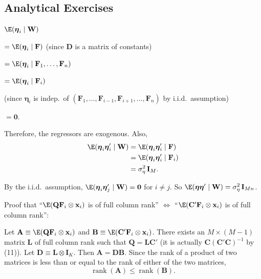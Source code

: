 \begin{answers}

\subsection*{Analytical Exercises}

$\E(\boldsymbol{\eta}_i \mid \mathbf{W})$

$= \E(\boldsymbol{\eta}_i \mid \mathbf{F})$ \quad (since $\mathbf{D}$ is a matrix of constants)

$= \E(\boldsymbol{\eta}_i \mid \mathbf{F}_1, \ldots, \mathbf{F}_n)$

$= \E(\boldsymbol{\eta}_i \mid \mathbf{F}_i)$

\quad (since $\boldsymbol{\eta}_i$ is indep.\ of
$(\mathbf{F}_1, \ldots, \mathbf{F}_{i-1}, \mathbf{F}_{i+1}, \ldots, \mathbf{F}_n)$
by i.i.d.\ assumption)

$= \mathbf{0}$.

Therefore, the regressors are exogenous. Also,
\begin{align*}
  \E(\boldsymbol{\eta}_i\boldsymbol{\eta}_i' \mid \mathbf{W})
  &= \E(\boldsymbol{\eta}_i\boldsymbol{\eta}_i' \mid \mathbf{F}) \\
  &= \E(\boldsymbol{\eta}_i\boldsymbol{\eta}_i' \mid \mathbf{F}_i) \\
  &= \sigma_\eta^2\,\mathbf{I}_M.
\end{align*}

By the i.i.d.\ assumption,
$\E(\boldsymbol{\eta}_i\boldsymbol{\eta}_j' \mid \mathbf{W}) = \mathbf{0}$ for $i \neq j$.
So $\E(\boldsymbol{\eta}\boldsymbol{\eta}' \mid \mathbf{W}) = \sigma_\eta^2\,\mathbf{I}_{Mn}$.

\medskip
{}
Proof that ``$\E(\mathbf{Q}\mathbf{F}_i \otimes \mathbf{x}_i)$ is of full column rank''
$\Leftrightarrow$
``$\E(\mathbf{C}'\mathbf{F}_i \otimes \mathbf{x}_i)$ is of full column rank'':

Let $\mathbf{A} \equiv \E(\mathbf{Q}\mathbf{F}_i \otimes \mathbf{x}_i)$ and
$\mathbf{B} \equiv \E(\mathbf{C}'\mathbf{F}_i \otimes \mathbf{x}_i)$.
There exists an $M \times (M-1)$
matrix $\mathbf{L}$ of full column rank such that $\mathbf{Q} = \mathbf{L}\mathbf{C}'$
(it is actually $\mathbf{C}(\mathbf{C}'\mathbf{C})^{-1}$ by
(11)). Let $\mathbf{D} \equiv \mathbf{L} \otimes \mathbf{I}_K$. Then $\mathbf{A} = \mathbf{D}\mathbf{B}$.
Since the rank of a product of two
matrices is less than or equal to the rank of either of the two matrices,
\begin{equation}
  \operatorname{rank}(\mathbf{A}) \leq \operatorname{rank}(\mathbf{B}). \tag{1}
\end{equation}


\end{answers}
